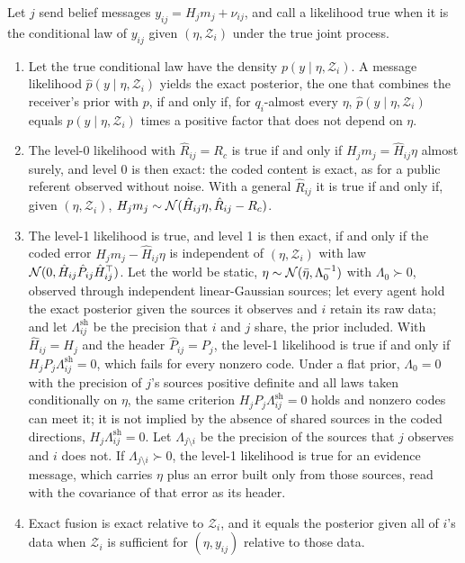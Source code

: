 \begin{proposition}\label{prop:fw-level-optimality}
Let $j$ send belief messages $y_{ij}=H_jm_j+\nu_{ij}$, and call a likelihood true when it is the conditional law of $y_{ij}$ given $(\eta,\mathcal Z_i)$ under the true joint process.
\begin{enumerate}
\item[(a)] Let the true conditional law have the density $p(y\mid\eta,\mathcal Z_i)$. A message likelihood $\hat p(y\mid\eta,\mathcal Z_i)$ yields the exact posterior, the one that combines the receiver's prior with $p$, if and only if, for $q_i$-almost every $\eta$, $\hat p(y\mid\eta,\mathcal Z_i)$ equals $p(y\mid\eta,\mathcal Z_i)$ times a positive factor that does not depend on $\eta$.
\item[(b)] The level-0 likelihood with $\hat R_{ij}=R_c$ is true if and only if $H_jm_j=\hat H_{ij}\eta$ almost surely, and level 0 is then exact: the coded content is exact, as for a public referent observed without noise. With a general $\hat R_{ij}$ it is true if and only if, given $(\eta,\mathcal Z_i)$, $H_jm_j\sim\mathcal{N}(\hat H_{ij}\eta,\hat R_{ij}-R_c)$.
\item[(c)] The level-1 likelihood is true, and level 1 is then exact, if and only if the coded error $H_jm_j-\hat H_{ij}\eta$ is independent of $(\eta,\mathcal Z_i)$ with law $\mathcal{N}(0,\hat H_{ij}\hat P_{ij}\hat H_{ij}^\top)$. Let the world be static, $\eta\sim\mathcal{N}(\bar\eta,\Lambda_0^{-1})$ with $\Lambda_0\succ0$, observed through independent linear-Gaussian sources; let every agent hold the exact posterior given the sources it observes and $i$ retain its raw data; and let $\Lambda^{\mathrm{sh}}_{ij}$ be the precision that $i$ and $j$ share, the prior included. With $\hat H_{ij}=H_j$ and the header $\hat P_{ij}=P_j$, the level-1 likelihood is true if and only if $H_jP_j\Lambda^{\mathrm{sh}}_{ij}=0$, which fails for every nonzero code. Under a flat prior, $\Lambda_0=0$ with the precision of $j$'s sources positive definite and all laws taken conditionally on $\eta$, the same criterion $H_jP_j\Lambda^{\mathrm{sh}}_{ij}=0$ holds and nonzero codes can meet it; it is not implied by the absence of shared sources in the coded directions, $H_j\Lambda^{\mathrm{sh}}_{ij}=0$. Let $\Lambda_{j\setminus i}$ be the precision of the sources that $j$ observes and $i$ does not. If $\Lambda_{j\setminus i}\succ0$, the level-1 likelihood is true for an evidence message, which carries $\eta$ plus an error built only from those sources, read with the covariance of that error as its header.
\item[(d)] Exact fusion is exact relative to $\mathcal Z_i$, and it equals the posterior given all of $i$'s data when $\mathcal Z_i$ is sufficient for $(\eta,y_{ij})$ relative to those data.
\end{enumerate}
\end{proposition}

